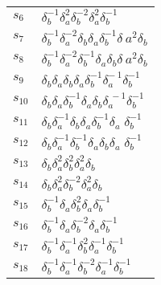 \documentclass{article}
\begin{document}
\begin{center}
\begin{tabular}{ll}
$s_{6}$ & $\delta_b^{-1}\delta_a^{2}\delta_b^{-2}\delta_a^{2}\delta_b^{-1}$ \\
$s_{7}$ & $\delta_b^{-1}\delta_a^{-2}\delta_b^{}\delta_a^{}\delta_b^{-1}\delta_\
a^{2}\delta_b^{}$ \\
$s_{8}$ & $\delta_b^{-1}\delta_a^{-2}\delta_b^{-1}\delta_a^{}\delta_b^{}\delta_\
a^{2}\delta_b^{}$ \\
$s_{9}$ & $\delta_b^{}\delta_a^{}\delta_b^{}\delta_a^{}\delta_b^{-1}\delta_a^{-\
1}\delta_b^{-1}$ \\
$s_{10}$ & $\delta_b^{}\delta_a^{}\delta_b^{-1}\delta_a^{}\delta_b^{}\delta_a^{\
-1}\delta_b^{-1}$ \\
$s_{11}$ & $\delta_b^{}\delta_a^{-1}\delta_b^{}\delta_a^{}\delta_b^{-1}\delta_a\
^{}\delta_b^{-1}$ \\
$s_{12}$ & $\delta_b^{}\delta_a^{-1}\delta_b^{-1}\delta_a^{}\delta_b^{}\delta_a\
^{}\delta_b^{-1}$ \\
$s_{13}$ & $\delta_b^{}\delta_a^{2}\delta_b^{2}\delta_a^{2}\delta_b^{}$ \\
$s_{14}$ & $\delta_b^{}\delta_a^{2}\delta_b^{-2}\delta_a^{2}\delta_b^{}$ \\
$s_{15}$ & $\delta_b^{-1}\delta_a^{}\delta_b^{2}\delta_a^{}\delta_b^{-1}$ \\
$s_{16}$ & $\delta_b^{-1}\delta_a^{}\delta_b^{-2}\delta_a^{}\delta_b^{-1}$ \\
$s_{17}$ & $\delta_b^{-1}\delta_a^{-1}\delta_b^{2}\delta_a^{-1}\delta_b^{-1}$ \\
$s_{18}$ & $\delta_b^{-1}\delta_a^{-1}\delta_b^{-2}\delta_a^{-1}\delta_b^{-1}$ 
\\
\bottomrule
\end{tabular}
\end{center}

\thispagestyle{empty}
\end{document}
